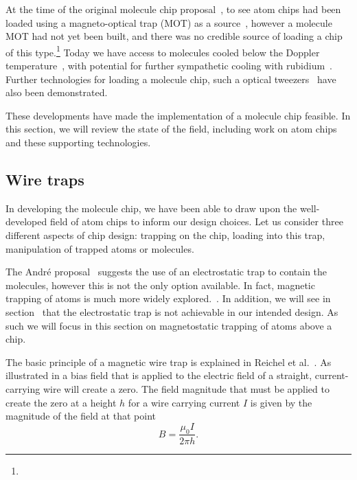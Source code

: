 
At the time of the original molecule chip proposal~\cite{Andre2006}, to see atom
chips had been loaded using a magneto-optical trap (MOT) as a
source~\cite{Reichel1999, Ott2001}, however a molecule MOT had not yet been
built, and there was no credible source of loading a chip of this
type.\footnote{}
%
Today we have access to molecules cooled below the Doppler
temperature~\cite{Truppe2017}, with potential for further sympathetic cooling
with rubidium~. Further technologies for loading a
molecule chip, such a optical tweezers~\cite{Liueaar7797} have also been
demonstrated.

These developments have made the implementation of a molecule chip feasible. In
this section, we will review the state of the field, including work on atom
chips and these supporting technologies.

\subsection{Wire traps}

In developing the molecule chip, we have been able to draw upon the
well-developed field of atom chips to inform our design choices. Let us consider
three different aspects of chip design: trapping on the chip, loading into this
trap, manipulation of trapped atoms or molecules.

The Andr\'e proposal~\cite{Andre2006} suggests the use of an electrostatic trap
to contain the molecules, however this is not the only option available. In
fact, magnetic trapping of atoms is much more widely explored.~\cite{2011Ac}.
 In addition, we will see in section~%
that the electrostatic trap is not achievable in our intended design. As such we
will focus in this section on magnetostatic trapping of atoms above a chip.

The basic principle of a magnetic wire trap is explained in Reichel et
al.~\cite{Reichel1999}. As illustrated in  a
bias field that is applied to the electric field of a straight, current-carrying
wire will create a zero. The field magnitude that must be applied to create the
zero at a height $h$ for a wire carrying current $I$ is given by the magnitude
of the field at that point~\cite{Jackson1975}
%
\begin{equation}
  B = \frac{\mu_0 I}{2\pi h}.
  \label{litrev:eqn:bias}
\end{equation}

